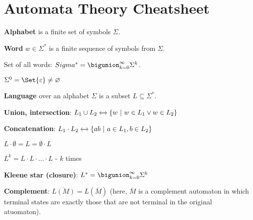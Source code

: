 \documentclass[a4paper,10pt]{article}
\begin{document}

\setcounter{section}{5}%
\section{Automata Theory Cheatsheet}

\begin{terms}
    \item \textbf{Alphabet} is a finite set of symbols $\Sigma$.

    \begin{terms}
        \item \textbf{Word} $w \in \Sigma^*$ is a finite sequence of symbols from $\Sigma$.

        \item Set of all words: $Sigma^* = \bigunion_{k = 0}^{\infty} \Sigma^k$.

        \item $\Sigma^0 = \Set{\varepsilon} \neq \emptyset$
    \end{terms}

    \item \textbf{Language} over an alphabet $\Sigma$ is a subset $L \subseteq \Sigma^*$.

    \begin{terms}
        \item \textbf{Union, intersection}: $L_1 \cup L_2 \xleftrightarrow{} \{w\ |\ w \in L_1 \lor w \in L_2\}$

        \item \textbf{Concatenation}: $L_1 \cdot L_2 \xleftrightarrow{} \{ab\ |\ a \in L_1, b \in L_2\}$

        \begin{terms}
            \item $L \cdot \emptyset = L = \emptyset \cdot L$

            \item $L^k = L \cdot L \cdot ... \cdot L$ - $k$ times

            \item \textbf{Kleene star (closure)}: $L^* = \bigunion_{k = 0}^{\infty}\Sigma^k$
        \end{terms}

        \item \textbf{Complement}: $\overline{L(M)} = L(\overline{M})$ (here, $\overline{M}$ is a complement automaton in which terminal states are exactly those that are not terminal in the original atuomaton).


\end{terms}
\end{terms}
\end{document}
